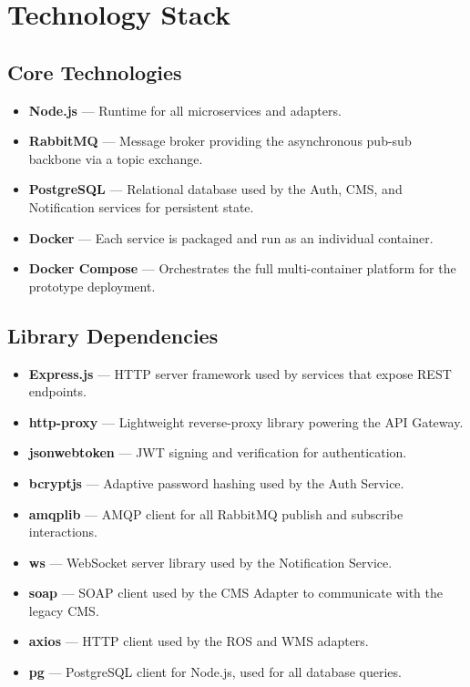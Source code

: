\section{Technology Stack}
\label{sec:technology}

\subsection{Core Technologies}
\label{subsec:core_tech}

\begin{itemize}
    \item \textbf{Node.js} --- Runtime for all microservices and adapters.
    \item \textbf{RabbitMQ} --- Message broker providing the asynchronous pub-sub backbone via a topic exchange.
    \item \textbf{PostgreSQL} --- Relational database used by the Auth, CMS, and Notification services for persistent state.
    \item \textbf{Docker} --- Each service is packaged and run as an individual container.
    \item \textbf{Docker Compose} --- Orchestrates the full multi-container platform for the prototype deployment.
\end{itemize}

\subsection{Library Dependencies}
\label{subsec:lib_deps}

\begin{itemize}
    \item \textbf{Express.js} --- HTTP server framework used by services that expose REST endpoints.
    \item \textbf{http-proxy} --- Lightweight reverse-proxy library powering the API Gateway.
    \item \textbf{jsonwebtoken} --- JWT signing and verification for authentication.
    \item \textbf{bcryptjs} --- Adaptive password hashing used by the Auth Service.
    \item \textbf{amqplib} --- AMQP client for all RabbitMQ publish and subscribe interactions.
    \item \textbf{ws} --- WebSocket server library used by the Notification Service.
    \item \textbf{soap} --- SOAP client used by the CMS Adapter to communicate with the legacy CMS.
    \item \textbf{axios} --- HTTP client used by the ROS and WMS adapters.
    \item \textbf{pg} --- PostgreSQL client for Node.js, used for all database queries.
\end{itemize}
